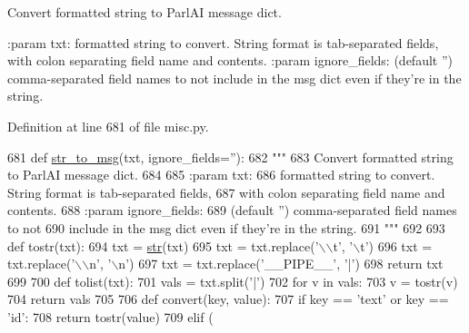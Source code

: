 \begin{DoxyVerb}Convert formatted string to ParlAI message dict.

:param txt:
    formatted string to convert. String format is tab-separated fields,
    with colon separating field name and contents.
:param ignore_fields:
    (default '') comma-separated field names to not
    include in the msg dict even if they're in the string.
\end{DoxyVerb}
 

Definition at line 681 of file misc.\+py.


\begin{DoxyCode}
681 \textcolor{keyword}{def }\hyperlink{namespaceparlai_1_1utils_1_1misc_a1b053cd9c56e6fa79b058fff587b3a48}{str\_to\_msg}(txt, ignore\_fields=''):
682     \textcolor{stringliteral}{"""}
683 \textcolor{stringliteral}{    Convert formatted string to ParlAI message dict.}
684 \textcolor{stringliteral}{}
685 \textcolor{stringliteral}{    :param txt:}
686 \textcolor{stringliteral}{        formatted string to convert. String format is tab-separated fields,}
687 \textcolor{stringliteral}{        with colon separating field name and contents.}
688 \textcolor{stringliteral}{    :param ignore\_fields:}
689 \textcolor{stringliteral}{        (default '') comma-separated field names to not}
690 \textcolor{stringliteral}{        include in the msg dict even if they're in the string.}
691 \textcolor{stringliteral}{    """}
692 
693     \textcolor{keyword}{def }tostr(txt):
694         txt = \hyperlink{namespacegenerate__task__READMEs_a5b88452ffb87b78c8c85ececebafc09f}{str}(txt)
695         txt = txt.replace(\textcolor{stringliteral}{'\(\backslash\)\(\backslash\)t'}, \textcolor{stringliteral}{'\(\backslash\)t'})
696         txt = txt.replace(\textcolor{stringliteral}{'\(\backslash\)\(\backslash\)n'}, \textcolor{stringliteral}{'\(\backslash\)n'})
697         txt = txt.replace(\textcolor{stringliteral}{'\_\_PIPE\_\_'}, \textcolor{stringliteral}{'|'})
698         \textcolor{keywordflow}{return} txt
699 
700     \textcolor{keyword}{def }tolist(txt):
701         vals = txt.split(\textcolor{stringliteral}{'|'})
702         \textcolor{keywordflow}{for} v \textcolor{keywordflow}{in} vals:
703             v = tostr(v)
704         \textcolor{keywordflow}{return} vals
705 
706     \textcolor{keyword}{def }convert(key, value):
707         \textcolor{keywordflow}{if} key == \textcolor{stringliteral}{'text'} \textcolor{keywordflow}{or} key == \textcolor{stringliteral}{'id'}:
708             \textcolor{keywordflow}{return} tostr(value)
709         \textcolor{keywordflow}{elif} (

\end{DoxyCode}

